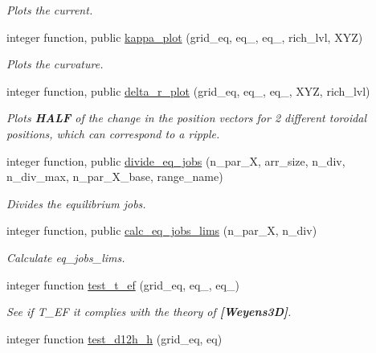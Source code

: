 \begin{DoxyCompactItemize}
\begin{DoxyCompactList}\small\item\em Plots the current. \end{DoxyCompactList}\item 
integer function, public \hyperlink{namespaceeq__ops_ad173efd111cb85c11bc2bc78a7555096}{kappa\+\_\+plot} (grid\+\_\+eq, eq\+\_, eq\+\_, rich\+\_\+lvl, X\+YZ)
\begin{DoxyCompactList}\small\item\em Plots the curvature. \end{DoxyCompactList}\item 
integer function, public \hyperlink{namespaceeq__ops_ac0a79893900631d25b170be0abd2c131}{delta\+\_\+r\+\_\+plot} (grid\+\_\+eq, eq\+\_, eq\+\_, X\+YZ, rich\+\_\+lvl)
\begin{DoxyCompactList}\small\item\em Plots {\bfseries H\+A\+LF} of the change in the position vectors for 2 different toroidal positions, which can correspond to a ripple. \end{DoxyCompactList}\item 
integer function, public \hyperlink{namespaceeq__ops_a8fae749abe55865d8135fef536a8e8f1}{divide\+\_\+eq\+\_\+jobs} (n\+\_\+par\+\_\+X, arr\+\_\+size, n\+\_\+div, n\+\_\+div\+\_\+max, n\+\_\+par\+\_\+\+X\+\_\+base, range\+\_\+name)
\begin{DoxyCompactList}\small\item\em Divides the equilibrium jobs. \end{DoxyCompactList}\item 
integer function, public \hyperlink{namespaceeq__ops_a4e20b8725fce149449f83754244dc84e}{calc\+\_\+eq\+\_\+jobs\+\_\+lims} (n\+\_\+par\+\_\+X, n\+\_\+div)
\begin{DoxyCompactList}\small\item\em Calculate {\ttfamily eq\+\_\+jobs\+\_\+lims}. \end{DoxyCompactList}\item 
integer function \hyperlink{namespaceeq__ops_a1f5049c3e309fa23ee46fd116c9344f1}{test\+\_\+t\+\_\+ef} (grid\+\_\+eq, eq\+\_, eq\+\_)
\begin{DoxyCompactList}\small\item\em See if {\ttfamily T\+\_\+\+EF} it complies with the theory of {\bfseries [Weyens3D]}. \end{DoxyCompactList}\item 
integer function \hyperlink{namespaceeq__ops_a003df1e1ab90dc6f586c3eed3dd067e8}{test\+\_\+d12h\+\_\+h} (grid\+\_\+eq, eq)

\end{DoxyCompactItemize}

